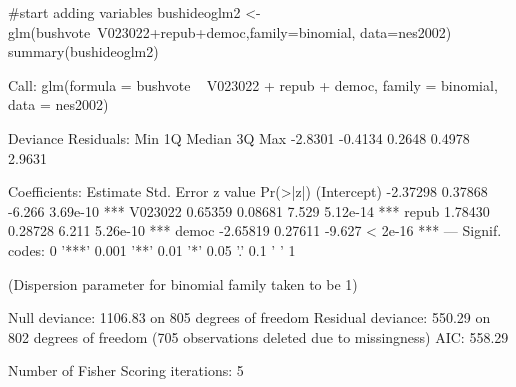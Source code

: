 \begin{Schunk}
\begin{Sinput}
 #start adding variables 
 bushideoglm2 <- glm(bushvote~V023022+repub+democ,family=binomial, data=nes2002) 
 summary(bushideoglm2)
\end{Sinput}
\begin{Soutput}
Call:
glm(formula = bushvote ~ V023022 + repub + democ, family = binomial, 
    data = nes2002)

Deviance Residuals: 
    Min       1Q   Median       3Q      Max  
-2.8301  -0.4134   0.2648   0.4978   2.9631  

Coefficients:
            Estimate Std. Error z value Pr(>|z|)    
(Intercept) -2.37298    0.37868  -6.266 3.69e-10 ***
V023022      0.65359    0.08681   7.529 5.12e-14 ***
repub        1.78430    0.28728   6.211 5.26e-10 ***
democ       -2.65819    0.27611  -9.627  < 2e-16 ***
---
Signif. codes:  0 '***' 0.001 '**' 0.01 '*' 0.05 '.' 0.1 ' ' 1

(Dispersion parameter for binomial family taken to be 1)

    Null deviance: 1106.83  on 805  degrees of freedom
Residual deviance:  550.29  on 802  degrees of freedom
  (705 observations deleted due to missingness)
AIC: 558.29

Number of Fisher Scoring iterations: 5
\end{Soutput}
\end{Schunk}
